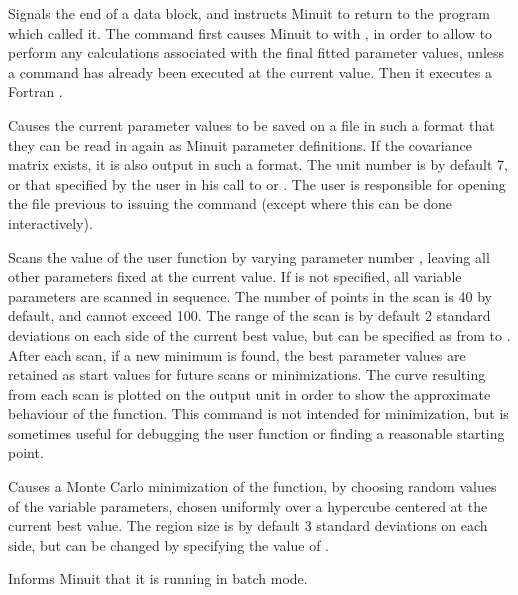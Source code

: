 
Signals the end of a data block, and instructs Minuit to
return to the program which called it.
The  command first causes Minuit to  
with ,
in order to allow  to perform any calculations associated with
the final fitted parameter values,
unless a  command has already been executed
at the current  value.
Then it executes a Fortran .


Causes the current parameter values to be saved on a file in such a
format that they can be read in again as Minuit parameter definitions.
If the covariance matrix exists, it is also output in such a format.
The unit number is by default 7, or that specified by the user in
his call to  or .
The user is responsible for opening the file previous to
issuing the  command 
(except where this can be done interactively).


Scans the value of the user function by varying parameter number
\Lit{[parno]}, leaving all other parameters fixed at the current value.
If \Lit{[parno]} is not specified, all variable parameters are scanned in
sequence. The number of points \Lit{[numpts]} in the scan is 40 by default,
and cannot exceed 100.
The range of the scan is by default 2 standard deviations on each side
of the current best value, but can be specified as from 
\Lit{[from]} to \Lit{[to]}.
After each scan, if a new minimum is found, the best parameter values
are retained as start values for future scans or minimizations.
The curve resulting from each scan is plotted on the output unit
in order to show the approximate behaviour of the function.
This command is not intended for minimization, but is sometimes useful
for debugging the user function or finding a reasonable starting point.


Causes a Monte Carlo minimization of the function, by choosing
random values of the variable parameters, chosen uniformly over a
hypercube centered at the current best value.  The region size is by
default 3 standard deviations on each side, but can be changed by
specifying the value of \Lit{[devs]}.


Informs Minuit that it is running in batch mode.

